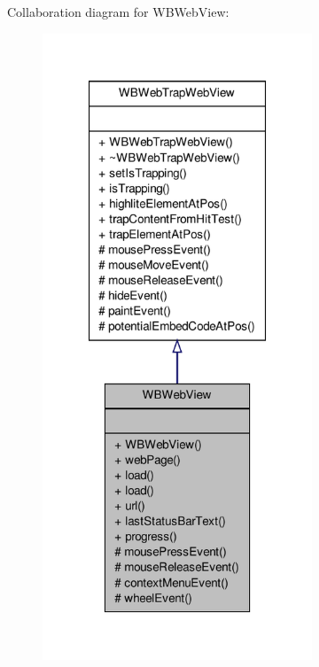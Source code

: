 Collaboration diagram for W\-B\-Web\-View\-:
\nopagebreak
\begin{figure}[H]
\begin{center}
\leavevmode
\includegraphics[width=228pt]{d2/d84/class_w_b_web_view__coll__graph}
\end{center}
\end{figure}
